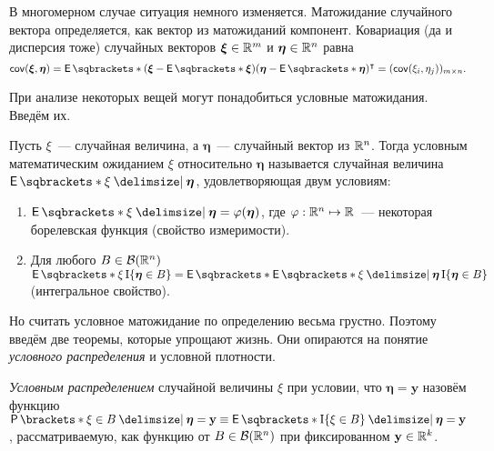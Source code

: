 В многомерном случае ситуация немного изменяется. Матожидание случайного 
вектора определяется, как вектор из матожиданий компонент. Ковариация (да и 
дисперсия тоже) случайных векторов \(\bm{\xi} \in \mathbb{R}^{m}\) и \(\bm{\eta} \in 
\mathbb{R}^{n}\) равна
\[
	\cov(\bm{\xi}, \bm{\eta}) = \E{(\bm{\xi} - \E{\bm{\xi}})(\bm{\eta} - 
	\E{\bm{\eta}})^{\intercal}} = (\cov(\xi_{i}, \eta_{j}))_{m \times n}.
\]

При анализе некоторых вещей могут понадобиться условные матожидания. Введём их.
\begin{definition}
	Пусть \(\xi\)~--- случайная величина, а \(\bm{\eta}\)~--- случайный вектор 
	из \(\mathbb{R}^{n}\). Тогда условным математическим ожиданием \(\xi\) относительно 
	\(\bm{\eta}\) называется случайная величина \(\E{\xi \given \bm{\eta}}\), 
	удовлетворяющая двум условиям:
	\begin{enumerate}
		\item \(\E{\xi \given \bm{\eta}} = \phi(\bm{\eta})\), где \(\varphi : 
		\mathbb{R}^{n} \mapsto \mathbb{R}\)~--- некоторая борелевская функция (свойство 
		измеримости).
		\item Для любого \(B \in \mathcal{B}(\mathbb{R}^{n})\) \(\E{\xi\I\{\bm{\eta} \in B\}} = 
		\E{\E{\xi \given \bm{\eta}}\I\{\bm{\eta} \in B\}}\) (интегральное 
		свойство).
	\end{enumerate}
\end{definition}

Но считать условное матожидание по определению весьма грустно. Поэтому введём 
две теоремы, которые упрощают жизнь. Они опираются на понятие \emph{условного 
распределения} и условной плотности.
\begin{definition}
	\emph{Условным распределением} случайной величины \(\xi\) при условии, что 
	\(\bm{\eta} = \mathbf{y}\) назовём функцию \(\Pr{\xi \in B \given \bm{\eta} 
	= \mathbf{y}} \equiv \E{\I\{\xi \in B\} \given \bm{\eta} = \mathbf{y}}\), 
	рассматриваемую, как функцию от \(B \in \mathcal{B}(\mathbb{R}^n)\) при фиксированном 
	\(\mathbf{y} \in \mathbb{R}^k\).
\end{definition}

